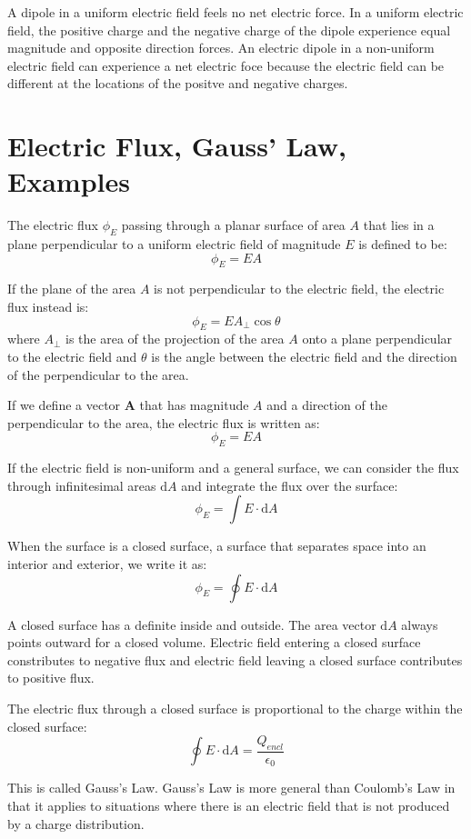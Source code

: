 \documentclass[../introphysics.tex]{subfiles}
\begin{document}
A dipole in a uniform electric field feels no net electric force. In a uniform electric field, the 
positive charge and the negative charge of the dipole experience equal magnitude and opposite direction forces. 
An electric dipole in a non-uniform electric field can experience a net electric foce because the electric field 
can be different at the locations of the positve and negative charges.

\section{Electric Flux, Gauss' Law, Examples}
The electric flux $\phi_E$ passing through a planar surface of area $A$ that lies in a plane perpendicular to a 
uniform electric field of magnitude $E$ is defined to be:
\[\phi_E=EA\]

If the plane of the area $A$ is not perpendicular to the electric field, the electric flux instead is:
\[\phi_E=EA_{\perp}\cos\theta\]
where $A_{\perp}$ is the area of the projection of the area $A$ onto a plane perpendicular to the 
electric field and $\theta$ is the angle between the electric field and the direction of the perpendicular to the area. 

If we define a vector $\textbf{A}$ that has magnitude $A$ and a direction of the perpendicular 
to the area, the electric flux is written as:
\[\phi_E=EA\]

If the electric field is non-uniform and a general surface, we can consider the flux through infinitesimal areas 
$\mathrm{d}A$ and integrate the flux over the surface:
\[\phi_E=\int E\cdot\mathrm{d}A\]

When the surface is a closed surface, a surface that separates space into an interior and exterior, we write it as:
\[\phi_E=\oint E\cdot\mathrm{d}A\]

A closed surface has a definite inside and outside. The area vector $\mathrm{d}A$ always points outward for a closed volume. 
Electric field entering a closed surface constributes to negative flux and electric field leaving a closed 
surface contributes to positive flux.

The electric flux through a closed surface is proportional to the charge within the closed surface:
\[\oint E\cdot\mathrm{d}A=\frac{Q_{encl}}{\epsilon_0}\]

This is called Gauss's Law. Gauss's Law is more general than Coulomb's Law in that it applies to 
situations where there is an electric field that is not produced by a charge distribution.
\end{document}
